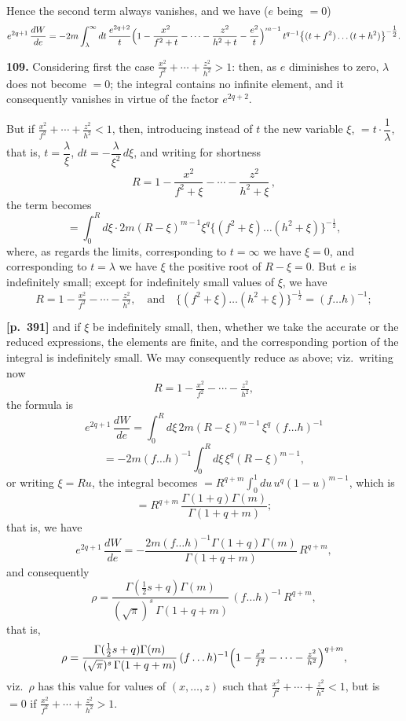 \documentclass[11pt,a4paper]{article}
\begin{document}
Hence the second term always vanishes, and we have ($e$ being $= 0$)
\[
e^{2q+1}\,\frac{dW}{de} = -2 m\int_{\lambda}^{\infty} dt\,\frac{e^{2q+2}}{t}\Bigl(1 - \frac{x^{2}}{f^{2}+t} - \cdots - \frac{z^{2}}{h^{2}+t} - \frac{e^{2}}{t}\Bigr)^{m-1}\, t^{q-1}\bigl\{(t+f^{2})\ldots(t+h^{2})\bigr\}^{-\tfrac{1}{2}}.
\]

\textbf{109.} Considering first the case $\tfrac{x^{2}}{f^{2}} + \cdots + \tfrac{z^{2}}{h^{2}} > 1$: then, as $e$ diminishes to zero, $\lambda$ does not become $= 0$; the integral contains no infinite element, and it consequently vanishes in virtue of the factor $e^{2q+2}$.

But if $\tfrac{x^{2}}{f^{2}} + \cdots + \tfrac{z^{2}}{h^{2}} < 1$, then, introducing instead of $t$ the new variable $\xi$, $= t \cdot \dfrac{1}{\lambda}$, that is, $t = \dfrac{\lambda}{\xi}$, $dt = -\dfrac{\lambda}{\xi^{2}}\,d\xi$, and writing for shortness
\[
R = 1 - \frac{x^{2}}{f^{2}+\xi} - \cdots - \frac{z^{2}}{h^{2}+\xi}\,,
\]
the term becomes
\[
= \int_{0}^{R} d\xi \cdot 2 m (R - \xi)^{m-1}\xi^{q}\bigl\{(f^{2}+\xi)\ldots(h^{2}+\xi)\bigr\}^{-\tfrac{1}{2}},
\]
where, as regards the limits, corresponding to $t = \infty$ we have $\xi = 0$, and corresponding to $t = \lambda$ we have $\xi$ the positive root of $R - \xi = 0$. But $e$ is indefinitely small; except for indefinitely small values of $\xi$, we have
\[
R = 1 - \tfrac{x^{2}}{f^{2}} - \cdots - \tfrac{z^{2}}{h^{2}},\quad\text{and}\quad
\bigl\{(f^{2}+\xi)\ldots(h^{2}+\xi)\bigr\}^{-\tfrac{1}{2}} = (f\ldots h)^{-1};
\]

\noindent\textbf{[p.~391]}\quad
and if $\xi$ be indefinitely small, then, whether we take the accurate or the reduced expressions, the elements are finite, and the corresponding portion of the integral is indefinitely small. We may consequently reduce as above; viz.\ writing now
\[
R = 1 - \tfrac{x^{2}}{f^{2}} - \cdots - \tfrac{z^{2}}{h^{2}},
\]
the formula is
\[
e^{2q+1}\,\frac{dW}{de} = \int_{0}^{R} d\xi\, 2 m (R - \xi)^{m-1}\,\xi^{q}\,(f\ldots h)^{-1}
\]
\[
= -2 m (f\ldots h)^{-1}\int_{0}^{R} d\xi\,\xi^{q}(R - \xi)^{m-1},
\]
or writing $\xi = R u$, the integral becomes $= R^{q+m}\int_{0}^{1} du\, u^{q}(1 - u)^{m-1}$, which is
\[
= R^{q+m}\,\frac{\Gamma(1 + q)\Gamma(m)}{\Gamma(1 + q + m)};
\]
that is, we have
\[
e^{2q+1}\,\frac{dW}{de} = -\frac{2 m (f\ldots h)^{-1}\Gamma(1+q)\Gamma(m)}{\Gamma(1+q+m)}\,R^{q+m},
\]
and consequently
\[
\rho = \frac{\Gamma(\tfrac{1}{2}s + q)\Gamma(m)}{(\sqrt{\pi})^{s}\,\Gamma(1+q+m)}\,(f\ldots h)^{-1}\,R^{q+m},
\]
that is,
\[
\rho = \frac{\Gamma(\tfrac{1}{2}s + q)\Gamma(m)}{(\sqrt{\pi})^{s}\,\Gamma(1 + q + m)}\,(f\ldots h)^{-1}\Bigl(1 - \tfrac{x^{2}}{f^{2}} - \cdots - \tfrac{z^{2}}{h^{2}}\Bigr)^{q+m},
\]
viz.\ $\rho$ has this value for values of $(x, \ldots, z)$ such that $\tfrac{x^{2}}{f^{2}} + \cdots + \tfrac{z^{2}}{h^{2}} < 1$, but is $= 0$ if $\tfrac{x^{2}}{f^{2}} + \cdots + \tfrac{z^{2}}{h^{2}} > 1$.
\end{document}
